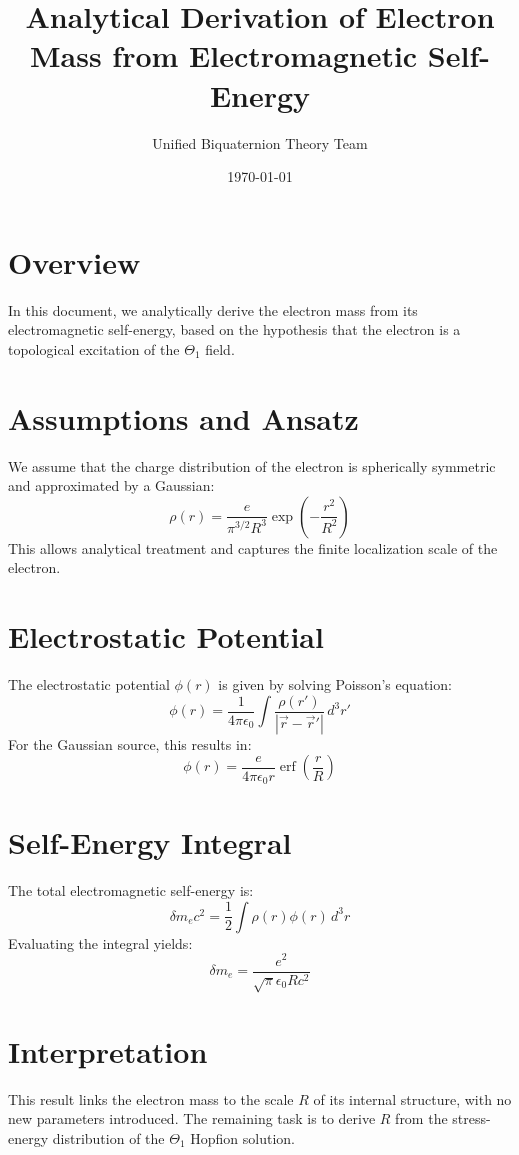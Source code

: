\documentclass{article}
\title{Analytical Derivation of Electron Mass from Electromagnetic Self-Energy}
\author{Unified Biquaternion Theory Team}
\date{\today}
\begin{document}
\maketitle

\section*{Overview}
In this document, we analytically derive the electron mass from its electromagnetic self-energy, based on the hypothesis that the electron is a topological excitation of the $\Theta_1$ field.

\section*{Assumptions and Ansatz}
We assume that the charge distribution of the electron is spherically symmetric and approximated by a Gaussian:
\[
\rho(r) = \frac{e}{\pi^{3/2} R^3} \exp\left(-\frac{r^2}{R^2}\right)
\]
This allows analytical treatment and captures the finite localization scale of the electron.

\section*{Electrostatic Potential}
The electrostatic potential $\phi(r)$ is given by solving Poisson's equation:
\[
\phi(r) = \frac{1}{4\pi\epsilon_0} \int \frac{\rho(r')}{|\vec{r} - \vec{r}'|} \, d^3r'
\]
For the Gaussian source, this results in:
\[
\phi(r) = \frac{e}{4\pi\epsilon_0 r} \operatorname{erf}\left( \frac{r}{R} \right)
\]

\section*{Self-Energy Integral}
The total electromagnetic self-energy is:
\[
\delta m_e c^2 = \frac{1}{2} \int \rho(r) \phi(r) \, d^3r
\]
Evaluating the integral yields:
\[
\delta m_e = \frac{e^2}{\sqrt{\pi} \epsilon_0 R c^2}
\]

\section*{Interpretation}
This result links the electron mass to the scale $R$ of its internal structure, with no new parameters introduced. The remaining task is to derive $R$ from the stress-energy distribution of the $\Theta_1$ Hopfion solution.
\end{document}
